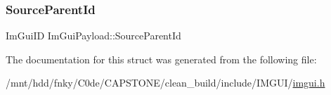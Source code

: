 \mbox{\label{structImGuiPayload_a1757c714dd47f09b645a8eba2912849d}} 
\subsubsection{\texorpdfstring{Source\+Parent\+Id}{SourceParentId}}
{\footnotesize\ttfamily Im\+Gui\+ID Im\+Gui\+Payload\+::\+Source\+Parent\+Id}



The documentation for this struct was generated from the following file\+:\begin{DoxyCompactItemize}
\item 
/mnt/hdd/fnky/\+C0de/\+C\+A\+P\+S\+T\+O\+N\+E/clean\+\_\+build/include/\+I\+M\+G\+U\+I/\hyperlink{imgui_8h}{imgui.\+h}\end{DoxyCompactItemize}
